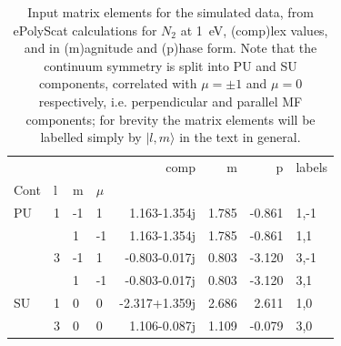 \documentclass[10pt]{article}
\begin{document}











\begin{table}
\centering
\begin{tabular}{llllrrrl}
\toprule
   &   &    &    &          comp &     m &      p & labels \\
Cont & l & m & $\mu$ &               &       &        &        \\
\midrule
PU & 1 & -1 &  1 &  1.163-1.354j & 1.785 & -0.861 &   1,-1 \\
   &   &  1 & -1 &  1.163-1.354j & 1.785 & -0.861 &    1,1 \\
   & 3 & -1 &  1 & -0.803-0.017j & 0.803 & -3.120 &   3,-1 \\
   &   &  1 & -1 & -0.803-0.017j & 0.803 & -3.120 &    3,1 \\
SU & 1 &  0 &  0 & -2.317+1.359j & 2.686 &  2.611 &    1,0 \\
   & 3 &  0 &  0 &  1.106-0.087j & 1.109 & -0.079 &    3,0 \\
\bottomrule
\end{tabular}

\caption{{\label{tab:inputMatE}Input matrix elements for the simulated data, from ePolyScat calculations for $N_2$ at 1~eV, (comp)lex values, and in (m)agnitude and (p)hase form. Note that the continuum symmetry is split into PU and SU components, correlated with $\mu=\pm1$ and $\mu=0$ respectively, i.e. perpendicular and parallel MF components; for brevity the matrix elements will be labelled simply by $|l,m\rangle$ in the text in general.}}
\end{table}
\end{document}

